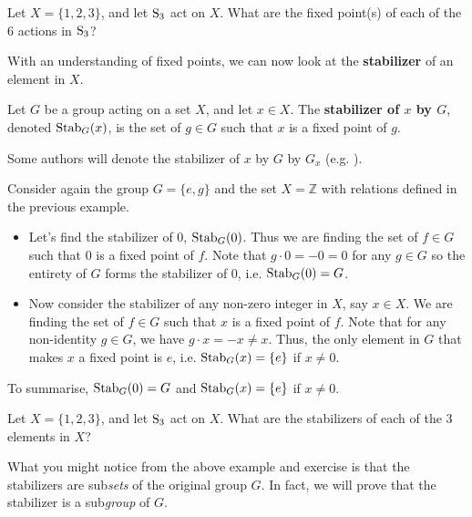 \begin{exercise}
    Let $X = \{1, 2, 3\}$, and let $\mathrm{S}_{3}$ act on $X$. What are the fixed point(s) of each of the 6 actions in $\mathrm{S}_{3}$?
\end{exercise}

With an understanding of fixed points, we can now look at the \textbf{stabilizer} of an element in $X$.

\begin{definition}
    Let $G$ be a group acting on a set $X$, and let $x \in X$. The \textbf{stabilizer of $x$ by $G$}, denoted $\mathrm{Stab}_{G}(x)$, is the set of $g \in G$ such that $x$ is a fixed point of $g$.
\end{definition}
\begin{remark}
    Some authors will denote the stabilizer of $x$ by $G$ by $G_x$ (e.g. \cite{clark_1984, humphreys_1996, brilliant_group-actions}).
\end{remark}

\begin{example}
    Consider again the group $G = \{e, g\}$ and the set $X = \mathbb{Z}$ with relations defined in the previous example.
    \begin{itemize}
        \item Let's find the stabilizer of 0, $\mathrm{Stab}_{G}(0)$. Thus we are finding the set of $f \in G$ such that 0 is a fixed point of $f$. Note that $g \cdot 0 = -0 = 0$ for any $g \in G$ so the entirety of $G$ forms the stabilizer of 0, i.e. $\mathrm{Stab}_{G}(0) = G$.
        \item Now consider the stabilizer of any non-zero integer in $X$, say $x \in X$. We are finding the set of $f \in G$ such that $x$ is a fixed point of $f$. Note that for any non-identity $g \in G$, we have $g \cdot x = -x \neq x$. Thus, the only element in $G$ that makes $x$ a fixed point is $e$, i.e. $\mathrm{Stab}_{G}(x) = \{e\}$ if $x \neq 0$.
    \end{itemize}
    To summarise, $\mathrm{Stab}_{G}(0) = G$ and $\mathrm{Stab}_{G}(x) = \{e\}$ if $x \neq 0$.
\end{example}

\begin{exercise}
    Let $X = \{1, 2, 3\}$, and let $\mathrm{S}_{3}$ act on $X$. What are the stabilizers of each of the 3 elements in $X$?
\end{exercise}

What you might notice from the above example and exercise is that the stabilizers are sub\textit{sets} of the original group $G$. In fact, we will prove that the stabilizer is a sub\textit{group} of $G$.

